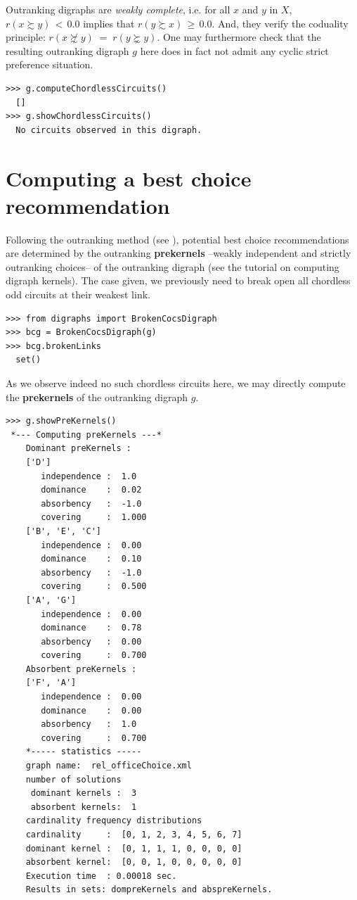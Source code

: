 Outranking digraphs are \emph{weakly complete}, i.e. for all $x$ and $y$ in $X$, $r(x \succsim y)\, <\, 0.0$ implies that $r(y \succsim x)\, \geq\, 0.0$. And, they verify the coduality principle:  $r(x \not\succsim y) \;=\; r(y \succnsim y)$. One may furthermore check that the resulting outranking digraph $g$ here does in fact not admit any cyclic strict preference situation.

\begin{lstlisting}
>>> g.computeChordlessCircuits()
  []
>>> g.showChordlessCircuits()
  No circuits observed in this digraph.
\end{lstlisting}

\section{Computing a \Rubis best choice recommendation}
\label{sec:6.3}

Following the \Rubis outranking method (see \citep{BIS-2008a}), potential best choice recommendations are determined by the outranking \textbf{prekernels} --weakly independent and strictly outranking choices-- of the outranking digraph (see the tutorial on computing digraph kernels). The case given, we previously need to break open all chordless odd circuits at their weakest link.

\begin{lstlisting}
>>> from digraphs import BrokenCocsDigraph
>>> bcg = BrokenCocsDigraph(g)
>>> bcg.brokenLinks
  set()
\end{lstlisting}

As we observe indeed no such chordless circuits here, we may directly compute the \textbf{prekernels} of the outranking digraph $g$.

\begin{lstlisting}[caption={Computing outranking and outranked prekernels},label=list:6.3]
>>> g.showPreKernels()
 *--- Computing preKernels ---*
    Dominant preKernels :
    ['D']
       independence :  1.0
       dominance    :  0.02
       absorbency   :  -1.0
       covering     :  1.000
    ['B', 'E', 'C']
       independence :  0.00
       dominance    :  0.10
       absorbency   :  -1.0
       covering     :  0.500
    ['A', 'G']
       independence :  0.00
       dominance    :  0.78
       absorbency   :  0.00
       covering     :  0.700
    Absorbent preKernels :
    ['F', 'A']
       independence :  0.00
       dominance    :  0.00
       absorbency   :  1.0
       covering     :  0.700
    *----- statistics -----
    graph name:  rel_officeChoice.xml
    number of solutions
     dominant kernels :  3
     absorbent kernels:  1
    cardinality frequency distributions
    cardinality     :  [0, 1, 2, 3, 4, 5, 6, 7]
    dominant kernel :  [0, 1, 1, 1, 0, 0, 0, 0]
    absorbent kernel:  [0, 0, 1, 0, 0, 0, 0, 0]
    Execution time  : 0.00018 sec.
    Results in sets: dompreKernels and abspreKernels.
\end{lstlisting}
  
